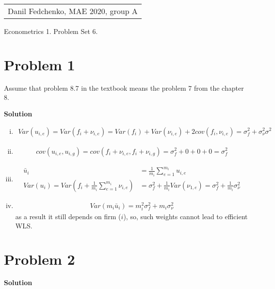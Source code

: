\documentclass[a4paper]{article}
\begin{document}
	\begin{flushright}
	\begin{tabular}{r}
		Danil Fedchenko, MAE 2020, group A \\
	\end{tabular}
\end{flushright}


\begin{center}
	Econometrics 1. Problem Set 6.
\end{center}
\section*{Problem 1}
Assume that problem 8.7 in the textbook means the problem 7 from the chapter 8.

\textbf{Solution}

\begin{enumerate}[(i)]
	\item \begin{align*}
	Var(u_{i, e}) = Var(f_i + \nu_{i, e}) = Var(f_i) + Var(\nu_{i, e}) + 2cov(f_i, \nu_{i, e}) = \sigma^2_f + \sigma^2_{\nu} \sigma^2
	\end{align*}
	\item \begin{align*}
	cov(u_{i, e}, u_{i, g}) = cov(f_i + \nu_{i, e}, f_i + \nu_{i, g}) = \sigma^2_f + 0 + 0 + 0 = \sigma^2_f
	\end{align*}
	\item \begin{align*}
	\bar{u}_i &= \frac{1}{m_i} \sum_{e=1}^{m_i} u_{i, e}\\
	Var(u_i) = Var\left(f_i + \frac{1}{m_i} \sum_{e=1}^{m_i} \nu_{i, e}\right) &= \sigma^2_f + \frac{1}{m_i}Var(\nu_{1, e}) = \sigma^2_f + \frac{1}{m_i}\sigma^2_{\nu}
	\end{align*}
	\item 
	\begin{align*}
	Var(m_i \bar{u}_i) = m_i^2\sigma^2_f + m_i \sigma^2_{\nu}
	\end{align*}
	as a result it still depends on firm ($i$), so, such weights cannot lead to efficient WLS.
\end{enumerate}

\section*{Problem 2}

\textbf{Solution}
\end{document}
